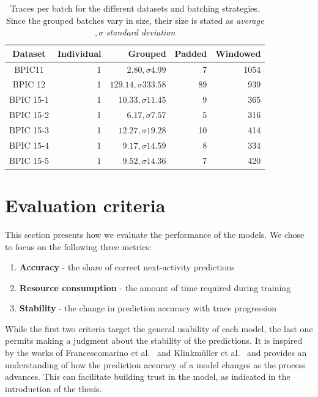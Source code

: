 \begin{table}
\centering
\begin{tabular}{c|rrrr}
Dataset & Individual & Grouped & Padded & Windowed \\
\hline
BPIC11    & 1 & $2.80 , \sigma 4.99$ & 7 & 1054\\
BPIC 12   & 1 & $129.14 , \sigma 333.58$ & 89 & 939\\
BPIC 15-1 & 1 & $10.33 , \sigma 11.45$ & 9 & 365\\
BPIC 15-2 & 1 & $6.17 , \sigma 7.57$ & 5 & 316\\
BPIC 15-3 & 1 & $12.27 , \sigma 19.28$ & 10 & 414\\
BPIC 15-4 & 1 & $9.17 , \sigma 14.59$ & 8 & 334\\
BPIC 15-5 & 1 & $9.52 , \sigma 14.36$ & 7 & 420\\
\end{tabular}
\caption[Batch sizes for each dataset and strategy]{Traces per batch for the different datasets and batching strategies. Since the grouped batches vary in size, their size is stated as \textit{average} $, \sigma$ \textit{standard deviation}}
\label{tab:batch-sizes}
\end{table}

\section{Evaluation criteria}\label{sec:eval:criteria}
This section presents how we evaluate the performance of the models. We chose to focus on the following three metrics:

\begin{enumerate}
    \item\textbf{Accuracy} - the share of correct next-activity predictions
    \item\textbf{Resource consumption} - the amount of time required during training
    \item\textbf{Stability} - the change in prediction accuracy with trace progression
\end{enumerate}

While the first two criteria target the general usability of each model, the last one permits making a judgment about the stability of the predictions. It is inspired by the works of Francescomarino et al.~\cite{francescomarino2015} and Klinkmüller et al.~\cite{klinkmuller2018reliablemonitoring} and provides an understanding of how the prediction accuracy of a model changes as the process advances. This can facilitate building trust in the model, as indicated in the introduction of the thesis.

